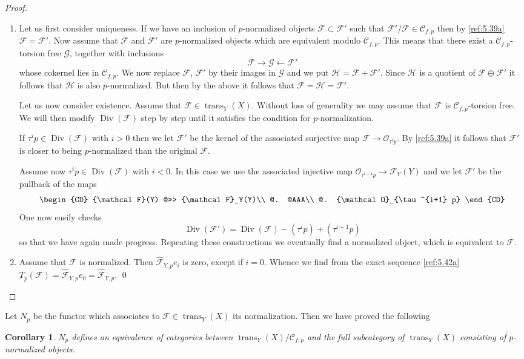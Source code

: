 \documentclass{amsproc}
\def\Cscr{{\mathcal C}}
\def\Fscr{{\mathcal F}}
\def\Gscr{{\mathcal G}}
\def\Hscr{{\mathcal H}}
\def\Oscr{{\mathcal O}}
\def\trans{\operatorname{trans}}
\def\Div{\operatorname{Div}}
\def\r{\rightarrow}
\def\l{\leftarrow}
\newtheorem{corollarys}[lemmas]{Corollary}
\theoremstyle{definition}
\theoremstyle{remark}
\numberwithin{equation}{section}
\numberwithin{table}{section}
\numberwithin{figure}{section}
\begin{document}
\begin{proof}
\begin{enumerate} 
\item Let us first consider uniqueness. If we have an inclusion of
  $p$-normalized objects $\Fscr\subset\Fscr'$ such that
  $\Fscr'/\Fscr\in\Cscr_{f,p}$ then by \eqref{ref:5.39a}
  $\Fscr=\Fscr'$. Now assume that $\Fscr$ and $\Fscr'$ are
  $p$-normalized objects which are equivalent modulo $\Cscr_{f,p}$.
  This means that there exist a $\Cscr_{f,p}$-torsion free $\Gscr$,
  together with inclusions
\[
\Fscr\r \Gscr\l \Fscr'
\]
whose  cokernel lies in $\Cscr_{f,p}$. 
We now replace $\Fscr$, $\Fscr'$ by their images in $\Gscr$ and
we put
$\Hscr=\Fscr+\Fscr'$. Since $\Hscr$ is a quotient of $\Fscr\oplus
\Fscr'$ it follows that $\Hscr$ is also $p$-normalized. But then by
the above it follows that
$\Fscr=\Hscr=\Fscr'$. 

Let us now consider existence. Assume that $\Fscr\in \trans_Y(X)$.
Without loss of generality we may assume that $\Fscr$ is
$\Cscr_{f,p}$-torsion free. We will then modify $\Div(\Fscr)$ step by
step until it satisfies the condition  for $p$-normalization.

If $\tau^i p\in\Div(\Fscr)$ with $i>0$ then we let $\Fscr'$ be the
kernel of the associated surjective map $\Fscr\r \Oscr_{\tau^i p}$. By \eqref{ref:5.39a} it follows that
$\Fscr'$ is closer to being $p$-normalized than the original $\Fscr$.

Assume now $\tau^i p\in\Div(\Fscr)$ with $i<0$. In this case we use
the associated injective map $\Oscr_{\tau^{i+1} p}\r\Fscr_Y(Y)$ and we let
$\Fscr'$ be the pullback of the maps
\[
\begin{CD}
\Fscr(Y) @>>> \Fscr_Y(Y)\\
@. @AAA\\
@. \Oscr_{\tau^{i+1} p}
\end{CD}
\]
One now easily checks 
\[
\Div(\Fscr')=\Div(\Fscr)-(\tau^i p)+(\tau^{i+1} p)
\]
so that we have again made progress.
Repeating these constructions we eventually
find a normalized object, which is equivalent to $\Fscr$.
\item
Assume that $\Fscr$ is normalized. Then 
$\hat{\Fscr}_{Y,p}e_i$ is zero, except if $i=0$. Whence we
find from the exact sequence \eqref{ref:5.42a}
$T_p(\Fscr)=\hat{\Fscr}_{Y,p}e_0=\hat{\Fscr}_{Y,p}$. \qed
\end{enumerate}
\def\qed{}
\end{proof}
 Let $N_p$ be the functor which associates to $\Fscr\in
\trans_Y(X)$ its normalization. Then we have proved the following
\begin{corollarys} $N_p$ defines an equivalence of categories between
  $\trans_Y(X)/\Cscr_{f,p}$ and the full subcategory of $\trans_Y(X)$
  consisting of $p$-normalized objects.
\end{corollarys}
\end{document}
